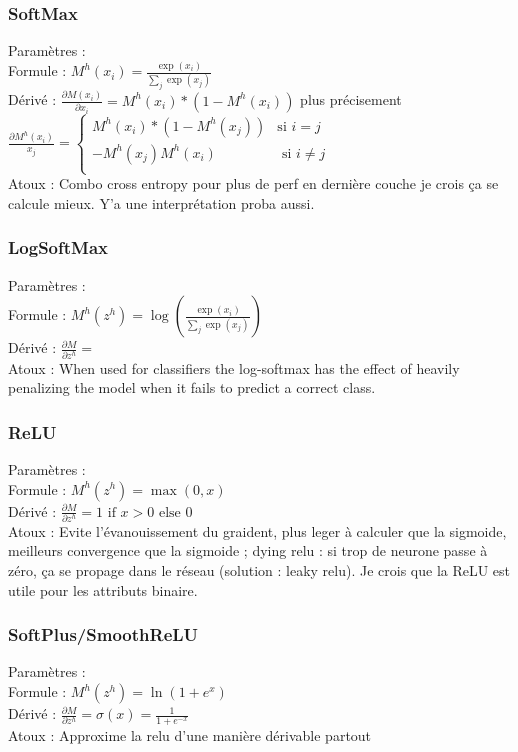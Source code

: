 \documentclass{article}
\theoremstyle{plain}%
\theoremstyle{definition}
\theoremstyle{remark}
\begin{document}
\begin{multicols}{2}
\subsubsection{SoftMax}
Paramètres : \\
Formule : $ M^h(x_i) = \frac{\exp(x_i)}{\sum_j \exp(x_j)} $ \\
Dérivé : $ \frac{\partial M(x_i)}{\partial x_i} = M^h(x_i) * (1 - M^h(x_i)) $ plus précisement $ \frac{\partial M^h(x_i)}{x_j} = \begin{cases}
    M^h(x_i) * ( 1 - M^h(x_j) ) &\text{si } i = j \\
    - M^h(x_j) M^h(x_i) &\text{ si } i \neq j \\
\end{cases}  $  \\
Atoux : Combo cross entropy pour plus de perf en dernière couche je crois ça se calcule mieux. Y'a une interprétation proba aussi.


\subsubsection{LogSoftMax}
Paramètres : \\
Formule : $ M^h(z^h) = \log ( \frac{ \exp(x_i) }{ \sum_j \exp(x_j) } ) $ \\
Dérivé : $ \frac{\partial M}{\partial z^h} =  $ \\
Atoux : When used for classifiers the log-softmax has the effect of heavily penalizing the model when it fails to predict a correct class.

\subsubsection{ReLU}
Paramètres : \\
Formule : $ M^h(z^h) = \max (0, x) $ \\
Dérivé : $ \frac{\partial M}{\partial z^h} = 1 \text{ if } x > 0 \text{ else } 0 $ \\
Atoux : Evite l'évanouissement du graident, plus leger à calculer que la sigmoide, meilleurs convergence que la sigmoide ; dying relu : si trop de neurone passe à zéro, ça se propage dans le réseau (solution : leaky relu). Je crois que la ReLU est utile pour les attributs binaire.

\subsubsection{SoftPlus/SmoothReLU}
Paramètres : \\
Formule : $ M^h(z^h) = \ln (1 + e^x) $ \\
Dérivé : $ \frac{\partial M}{\partial z^h} = \sigma (x) = \frac{1}{1 + e^{-x}} $ \\
Atoux : Approxime la relu d'une manière dérivable partout


\end{multicols}
\end{document}
